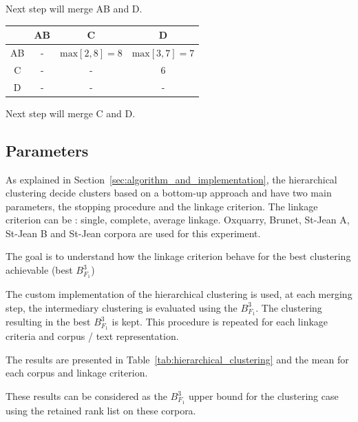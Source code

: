 \begin{example}
  \vspace{0.2cm}
  Next step will merge AB and D.

  \vspace{0.5cm}

  \begin{subexample}{\linewidth}
    \centering
    \begin{tabular}{c|c c c}
      \toprule
        & AB & C & D \\
      \midrule
      AB & - & $\text{max} \left[2, 8 \right] = 8$ & $\text{max} \left[3, 7 \right] = 7$ \\
      C  & - & - & 6 \\
      D  & - & - & - \\
      \bottomrule
    \end{tabular}
  \end{subexample}

  \vspace{0.2cm}
  Next step will merge C and D.
\end{example}


\subsection{Parameters\label{sec:hierarchical_clustering}}

As explained in Section~\ref{sec:algorithm_and_implementation}, the hierarchical clustering decide clusters based on a bottom-up approach and have two main parameters, the stopping procedure and the linkage criterion.
The linkage criterion can be : single, complete, average linkage.
Oxquarry, Brunet, St-Jean A, St-Jean B and St-Jean corpora are used for this experiment.

The goal is to understand how the linkage criterion behave for the best clustering achievable (best $B^3_{F_1}$)

The custom implementation of the hierarchical clustering is used, at each merging step, the intermediary clustering is evaluated using the $B^3_{F_1}$.
The clustering resulting in the best $B^3_{F_1}$ is kept.
This procedure is repeated for each linkage criteria and corpus / text representation.

The results are presented in Table~\ref{tab:hierarchical_clustering} and the mean for each corpus and linkage criterion.

These results can be considered as the $B^3_{F_1}$ upper bound for the clustering case using the retained rank list on these corpora.

